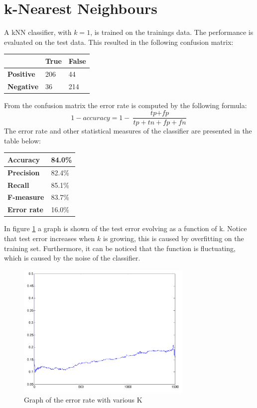 \documentclass[a4paper]{article}
\begin{document}
\section{k-Nearest Neighbours}
A kNN classifier, with $k = 1$, is trained on the trainings data. The performance is evaluated on the test data. This resulted in the following confusion matrix:
\begin{center}
\begin{tabular}{ | l | l | l | }
\hline
 & \textbf{True} & \textbf{False}\\
\hline
\textbf{Positive} & 206 & 44\\
\hline
\textbf{Negative} & 36 & 214\\
\hline
\end{tabular}
\end{center}
From the confusion matrix the error rate is computed by the following formula:
\begin{equation}
1 - \textit{accuracy} = 1 - \frac{\textit{tp} + \textit{fp}}{\textit{tp} + \textit{tn} + \textit{fp} + \textit{fn}}
\end{equation}
The error rate and other statistical measures of the classifier are presented in the table below:
\begin{center}
\begin{tabular}{ | l | l | }
\hline
\textbf{Accuracy} & 84.0\%\\
\hline
\textbf{Precision} & 82.4\%\\
\hline
\textbf{Recall} & 85.1\%\\
\hline
\textbf{F-measure} & 83.7\%\\
\hline
\textbf{Error rate} & 16.0\%\\
\hline
\end{tabular}
\end{center}
In figure \ref{error_rate} a graph is shown of the test error evolving as a function of k. Notice that test error increases when $k$ is growing, this is caused by overfitting on the training set. Furthermore, it can be noticed that the function is fluctuating, which is caused by the noise of the classifier.
\begin{figure}[!ht]
\centering
\includegraphics[width=0.75\textwidth]{images/error_rate_1500_1.pdf}
\caption{Graph of the error rate with various K}
\label{error_rate}
\end{figure}\\
\end{document}
